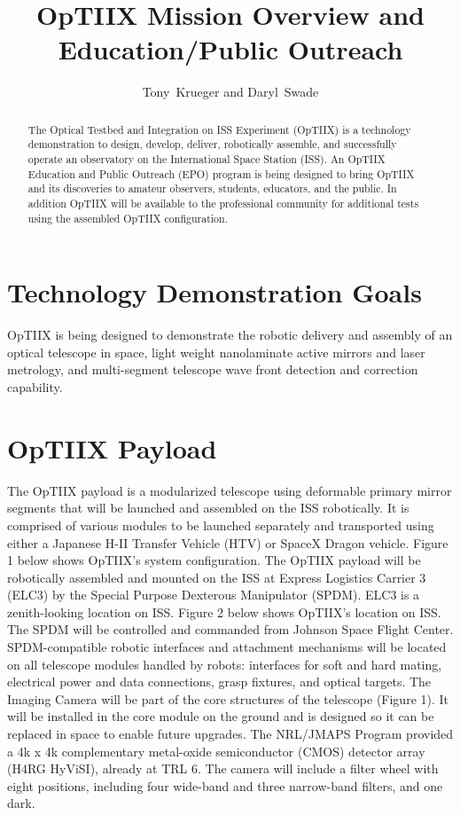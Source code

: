 
\resetcounters




\title{OpTIIX Mission Overview and Education/Public Outreach}
\author{Tony~Krueger and Daryl~Swade
}

\begin{abstract}
The Optical Testbed and Integration on ISS Experiment (OpTIIX) is a technology demonstration to design, develop, deliver, robotically assemble, and successfully operate an observatory on the International Space Station (ISS).  An OpTIIX Education and Public Outreach (EPO) program is being designed to bring OpTIIX and its discoveries to amateur observers, students, educators, and the public.  In addition OpTIIX will be available to the professional community for additional tests using the assembled OpTIIX configuration. 
\end{abstract}

\section{Technology Demonstration Goals}
OpTIIX is being designed to demonstrate the robotic delivery and assembly of an optical telescope in space, light weight nanolaminate active mirrors and laser metrology, and multi-segment telescope wave front detection and correction capability.

\section{OpTIIX Payload}
The OpTIIX payload is a modularized telescope using deformable primary mirror segments that will be launched and assembled on the ISS robotically.  It is comprised of various modules to be launched separately and transported using either a Japanese H-II Transfer Vehicle (HTV) or SpaceX Dragon vehicle.  Figure 1 below shows OpTIIX’s system configuration.  The OpTIIX payload will be robotically assembled and mounted on the ISS at Express Logistics Carrier 3 (ELC3) by the Special Purpose Dexterous Manipulator (SPDM).  ELC3 is a zenith-looking location on ISS.  Figure 2 below shows OpTIIX’s location on ISS. The SPDM will be controlled and commanded from Johnson Space Flight Center. SPDM-compatible robotic interfaces and attachment mechanisms will be located on all telescope modules handled by robots: interfaces for soft and hard mating, electrical power and data connections, grasp fixtures, and optical targets.  The Imaging Camera will be part of the core structures of the telescope (Figure 1). It will be installed in the core module on the ground and is designed so it can be replaced in space to enable future upgrades. The NRL/JMAPS Program provided a 4k x 4k complementary metal-oxide semiconductor (CMOS) detector array (H4RG HyViSI), already at TRL 6. The camera will include a filter wheel with eight positions, including four wide-band and three narrow-band filters, and one dark.

